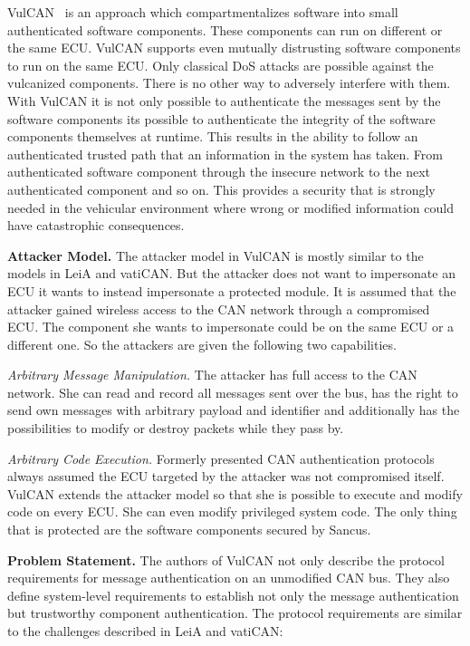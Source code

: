 VulCAN~\cite{VanBulck2017} is an approach which compartmentalizes software into
small authenticated software components. These components can run on different
or the same ECU\@. VulCAN supports even mutually distrusting software components
to run on the same ECU\@. Only classical DoS attacks are possible against the
vulcanized components. There is no other way to adversely interfere with them.
With VulCAN it is not only possible to authenticate the messages sent by the
software components its possible to authenticate the integrity of the software
components themselves at runtime. This results in the ability to follow an
authenticated trusted path that an information in the system has taken. From
authenticated software component through the insecure network to the next
authenticated component and so on. This provides a security that is strongly
needed in the vehicular environment where wrong or modified information could
have catastrophic consequences.

\par{\textbf{Attacker Model.}} The attacker model in VulCAN is mostly similar to
the models in LeiA and vatiCAN\@. But the attacker does not want to impersonate
an ECU it wants to instead impersonate a protected module. It is assumed that
the attacker gained wireless access to the CAN network through a compromised
ECU\@. The component she wants to impersonate could be on the same ECU or a
different one. So the attackers are given the following two capabilities.

\textit{Arbitrary Message Manipulation.} The attacker has full access to the CAN
network. She can read and record all messages sent over the bus, has the right
to send own messages with arbitrary payload and identifier and additionally has
the possibilities to modify or destroy packets while they pass by.

\textit{Arbitrary Code Execution.} Formerly presented CAN authentication
protocols always assumed the ECU targeted by the attacker was not compromised
itself. VulCAN extends the attacker model so that she is possible to execute and
modify code on every ECU\@. She can even modify privileged system code. The only
thing that is protected are the software components secured by Sancus.

\par{\textbf{Problem Statement.}} The authors of VulCAN not only describe the
protocol requirements for message authentication on an unmodified CAN bus. They
also define system-level requirements to establish not only the message
authentication but trustworthy component authentication. The protocol
requirements are similar to the challenges described in LeiA and vatiCAN\@:

